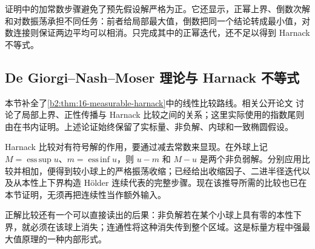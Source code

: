 证明中的加常数步骤避免了预先假设解严格为正。它还显示，正幂上界、倒数次解和对数振荡承担不同任务：前者给局部最大值，倒数把同一个结论转成最小值，对数连接则保证两边平均可以相消。只完成其中的正幂迭代，还不足以得到 Harnack 不等式。

\subsection{De Giorgi--Nash--Moser 理论与 Harnack 不等式}
\label{b2:subsec:H20104}

本节补全了\cref{b2:thm:16-measurable-harnack}中的线性比较路线。相关公开论文 \cite[Theorems 1.1--1.3 and Section 2]{Li2017Harnack}讨论了局部上界、正性传播与 Harnack 比较之间的关系；这里实际使用的指数尾则由在书内证明。上述论证始终保留了实标量、非负解、内球和一致椭圆假设。

\ProseParagraphBreak

Harnack 比较对有符号解的作用，要通过减去常数来显现。在外球上记 \(M=\operatorname*{ess\,sup}u\)、\(m=\operatorname*{ess\,inf}u\)，则 \(u-m\) 和 \(M-u\) 是两个非负弱解。分别应用比较并相加，便得到较小球上的严格振荡收缩；已经给出收缩因子、二进半径迭代以及从本性上下界构造 Hölder 连续代表的完整步骤。现在该推导所需的比较也已在本节证明，无须再把连续性当作额外输入。

\ProseParagraphBreak

正解比较还有一个可以直接读出的后果：非负解若在某个小球上具有零的本性下界，就必须在该球上消失；连通性将这种消失传到整个区域。这是标量方程中强最大值原理的一种内部形式。

